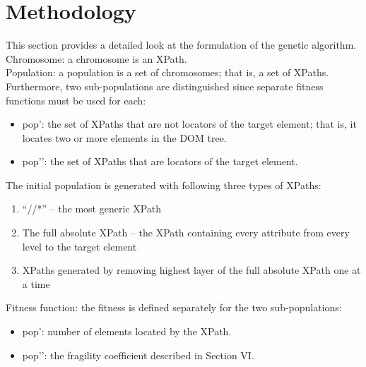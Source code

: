 \documentclass[format=acmlarge, nonacm=true]{acmart}
\begin{document}
\section{Methodology}
This section provides a detailed look at the formulation of the genetic algorithm.
Chromosome: a chromosome is an XPath.\\
Population: a population is a set of chromosomes; that is, a set of XPaths. Furthermore, two sub-populations are distinguished since separate fitness functions must be used for each:
\begin{itemize}
\item pop’: the set of XPaths that are not locators of the target element; that is, it locates two or more elements in the DOM tree.
\item pop’’: the set of XPaths that are locators of the target element.
\end{itemize}
The initial population is generated with following three types of XPaths:
\begin{enumerate}
	\item “//*” – the most generic XPath
	\item The full absolute XPath – the XPath containing every attribute from every level to the target element
	\item XPaths generated by removing highest layer of the full absolute XPath one at a time
\end{enumerate}
Fitness function: the fitness is defined separately for the two sub-populations:
\begin{itemize}
	\item pop’: number of elements located by the XPath.
	\item pop’’: the fragility coefficient described in Section VI.
\end{itemize}
\end{document}
